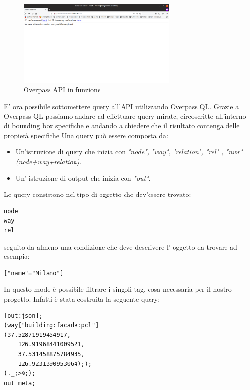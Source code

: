 \begin{figure}[H]
    \centering
    \includegraphics[width=0.7\textwidth]{Immagini/OverpassApiRunning.png}
    \caption{Overpass API in funzione}
    \label{fig:OverpassAPIRunning}
\end{figure}

E' ora possibile sottomettere query all'API utilizzando Overpass QL.
Grazie a Overpass QL possiamo andare ad effettuare query mirate, circoscritte all'interno di bounding box specifiche e andando a chiedere che il risultato contenga delle propietà specifiche
Una query può essere composta da:
\begin{itemize}
    \item Un'istruzione di query che inizia con \textit{"node", "way", "relation", "rel" , "nwr" (node+way+relation)}.
    \item Un' istruzione di output che inizia con \textit{"out"}. 
\end{itemize}

Le query consistono nel tipo di oggetto che dev'essere trovato:
\begin{lstlisting}
node
way
rel
\end{lstlisting}


seguito da almeno una condizione che deve descrivere l' oggetto da trovare ad esempio:\\
\begin{lstlisting}
["name"="Milano"]
\end{lstlisting}

In questo modo è possibile filtrare i singoli tag, cosa necessaria per il nostro progetto.
Infatti è stata costruita la seguente query:

\begin{lstlisting}[caption = {Query di Overpass QL}, captionpos=b,label={lst:OSMQuery}]
[out:json];
(way["building:facade:pcl"]
(37.52871919454917,
    126.91968441009521,
    37.531458875784935,
    126.9231390953064););
(._;>%;);
out meta;
\end{lstlisting}

